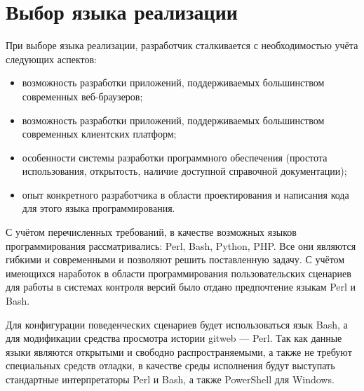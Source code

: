 \section{Выбор языка реализации} \label{technologic_langiage}


При выборе языка реализации, разработчик сталкивается с необходимостью учёта следующих аспектов:
\begin{itemize}
	\item возможность разработки приложений, поддерживаемых большинством современных веб-браузеров;
	\item возможность разработки приложений, поддерживаемых большинством современных клиентских платформ;
	\item особенности системы разработки программного обеспечения (простота использования, открытость, наличие доступной справочной документации);
	\item опыт конкретного разработчика в области проектирования и написания кода для этого языка программирования.
\end{itemize}

С учётом перечисленных требований, в качестве возможных языков программирования рассматривались: Perl, Bash, Python, PHP. Все они являются гибкими и современными и позволяют решить поставленную задачу. С учётом имеющихся наработок в области программирования пользовательских сценариев для работы в системах контроля версий было отдано предпочтение языкам Perl и Bash.

\vspace{\baselineskip}
Для конфигурации поведенческих сценариев будет использоваться язык Bash, а для модификации средства просмотра истории gitweb --- Perl. Так как данные языки являются открытыми и свободно распространяемыми, а также не требуют специальных средств отладки, в качестве среды исполнения будут выступать стандартные интерпретаторы Perl и Bash, а также PowerShell для Windows.